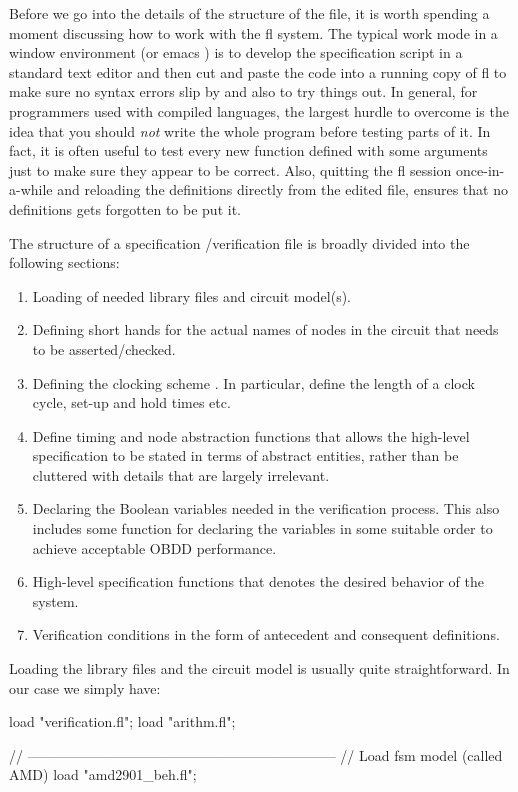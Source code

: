 Before we go into the details of the structure of the file, it is
worth spending a moment discussing how to work with the fl system.
The typical work mode in a window environment%
%
{} (or emacs%
%
{})
is to develop the specification script in a standard text editor and
then cut and paste%
%
{} the code into a running copy of fl to make sure
no syntax errors slip by and also to try things out.
In general, for programmers used with compiled languages, the largest
hurdle to overcome is the idea that you should {\em not} write the whole
program before testing parts of it.
In fact, it is often useful to test every new function defined
with some arguments just to make sure they appear to be correct.
Also, quitting the fl session once-in-a-while and reloading the
definitions directly from the edited file, ensures that
no definitions gets forgotten to be put it.

The structure of a specification%
%
{}/verification file is
broadly divided into the following sections:
\begin{enumerate}
\item
Loading of needed library files and circuit model(s).
\item
Defining short hands%
%
{} for the actual names of nodes in the
circuit that needs to be asserted/checked.
\item
Defining the clocking scheme%
%
{}.
In particular, define the length of a clock cycle, set-up and hold
times etc.
\item
Define timing and node abstraction functions%
%
{} that allows the
high-level specification to be stated in terms of abstract
entities, rather than be cluttered with details that are
largely irrelevant.
\item
Declaring the Boolean variables needed in the verification process.
This also includes some function for declaring the variables in some
suitable order to achieve acceptable OBDD performance.
\item 
High-level specification functions that denotes the desired
behavior of the system.
\item
Verification conditions in the form of antecedent%
%
{} and consequent%
%
{}
definitions.
\end{enumerate}

Loading the library files and the circuit model is usually
quite straightforward.
In our case we simply have:
\begin{hol}
load "verification.fl";
load "arithm.fl";

// ------------------------------------------------------------------
// Load fsm model (called AMD)
load "amd2901\_beh.fl";
\end{hol}

